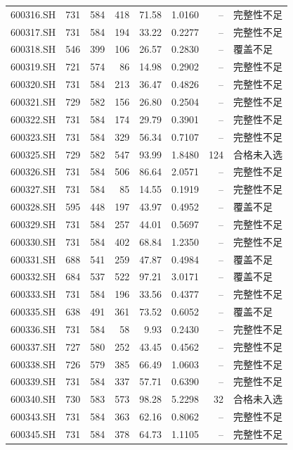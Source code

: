\documentclass[10pt,a4paper]{article}
\begin{document}
\begin{longtable}{lrrr r r r l}
600316.SH & 731 & 584 & 418 & 71.58 & 1.0160 & -- & 完整性不足\\
600317.SH & 731 & 584 & 194 & 33.22 & 0.2277 & -- & 完整性不足\\
600318.SH & 546 & 399 & 106 & 26.57 & 0.2830 & -- & 覆盖不足\\
600319.SH & 721 & 574 & 86 & 14.98 & 0.2902 & -- & 完整性不足\\
600320.SH & 731 & 584 & 213 & 36.47 & 0.4826 & -- & 完整性不足\\
600321.SH & 729 & 582 & 156 & 26.80 & 0.2504 & -- & 完整性不足\\
600322.SH & 731 & 584 & 174 & 29.79 & 0.3901 & -- & 完整性不足\\
600323.SH & 731 & 584 & 329 & 56.34 & 0.7107 & -- & 完整性不足\\
600325.SH & 729 & 582 & 547 & 93.99 & 1.8480 & 124 & 合格未入选\\
600326.SH & 731 & 584 & 506 & 86.64 & 2.0571 & -- & 完整性不足\\
600327.SH & 731 & 584 & 85 & 14.55 & 0.1919 & -- & 完整性不足\\
600328.SH & 595 & 448 & 197 & 43.97 & 0.4952 & -- & 覆盖不足\\
600329.SH & 731 & 584 & 257 & 44.01 & 0.5697 & -- & 完整性不足\\
600330.SH & 731 & 584 & 402 & 68.84 & 1.2350 & -- & 完整性不足\\
600331.SH & 688 & 541 & 259 & 47.87 & 0.4984 & -- & 覆盖不足\\
600332.SH & 684 & 537 & 522 & 97.21 & 3.0171 & -- & 覆盖不足\\
600333.SH & 731 & 584 & 196 & 33.56 & 0.4377 & -- & 完整性不足\\
600335.SH & 638 & 491 & 361 & 73.52 & 0.6052 & -- & 覆盖不足\\
600336.SH & 731 & 584 & 58 & 9.93 & 0.2430 & -- & 完整性不足\\
600337.SH & 727 & 580 & 252 & 43.45 & 0.4562 & -- & 完整性不足\\
600338.SH & 726 & 579 & 385 & 66.49 & 1.0603 & -- & 完整性不足\\
600339.SH & 731 & 584 & 337 & 57.71 & 0.6390 & -- & 完整性不足\\
600340.SH & 730 & 583 & 573 & 98.28 & 5.2298 & 32 & 合格未入选\\
600343.SH & 731 & 584 & 363 & 62.16 & 0.8062 & -- & 完整性不足\\
600345.SH & 731 & 584 & 378 & 64.73 & 1.1105 & -- & 完整性不足\\

\end{longtable}
\end{document}
